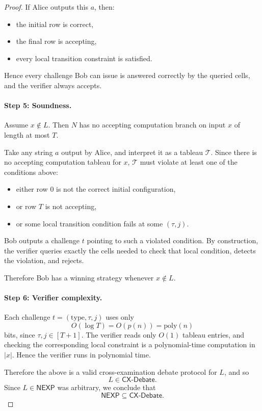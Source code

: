 \documentclass[11pt]{article}
\begin{document}
\begin{proof}
If Alice outputs this \(a\), then:
\begin{itemize}
    \item the initial row is correct,
    \item the final row is accepting,
    \item every local transition constraint is satisfied.
\end{itemize}
Hence every challenge Bob can issue is answered correctly by the queried cells, and the verifier always accepts.

\paragraph{Step 5: Soundness.}
Assume \(x\notin L\). Then \(N\) has no accepting computation branch on input \(x\) of length at most \(T\).

Take any string \(a\) output by Alice, and interpret it as a tableau \(\mathcal{T}\). Since there is no accepting computation tableau for \(x\), \(\mathcal{T}\) must violate at least one of the conditions above:
\begin{itemize}
    \item either row \(0\) is not the correct initial configuration,
    \item or row \(T\) is not accepting,
    \item or some local transition condition fails at some \((\tau,j)\).
\end{itemize}
Bob outputs a challenge \(t\) pointing to such a violated condition. By construction, the verifier queries exactly the cells needed to check that local condition, detects the violation, and rejects.

Therefore Bob has a winning strategy whenever \(x\notin L\).

\paragraph{Step 6: Verifier complexity.}
Each challenge \(t=(\mathrm{type},\tau,j)\) uses only
\[
O(\log T)=O(p(n))=\mathrm{poly}(n)
\]
bits, since \(\tau,j\in [T+1]\). The verifier reads only \(O(1)\) tableau entries, and checking the corresponding local constraint is a polynomial-time computation in \(|x|\). Hence the verifier runs in polynomial time.

Therefore the above is a valid cross-examination debate protocol for \(L\), and so
\[
L\in \mathsf{CX\text{-}Debate}.
\]
Since \(L\in\mathsf{NEXP}\) was arbitrary, we conclude that
\[
\mathsf{NEXP}\subseteq \mathsf{CX\text{-}Debate}.
\]
\end{proof}
\end{document}
